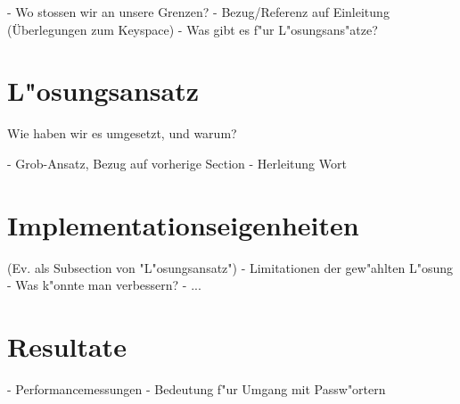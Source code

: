 \begin{refsection}
- Wo stossen wir an unsere Grenzen?
- Bezug/Referenz auf Einleitung (Überlegungen zum Keyspace)
- Was gibt es f"ur L"osungsans"atze?

\section{L"osungsansatz}

Wie haben wir es umgesetzt, und warum?

- Grob-Ansatz, Bezug auf vorherige Section
- Herleitung Wort

\section{Implementationseigenheiten}

(Ev. als Subsection von "L"osungsansatz")
- Limitationen der gew"ahlten L"osung
- Was k"onnte man verbessern?
- ...

\section{Resultate}

- Performancemessungen
- Bedeutung f"ur Umgang mit Passw"ortern

\printbibliography[heading=subbibliography]
\end{refsection}
